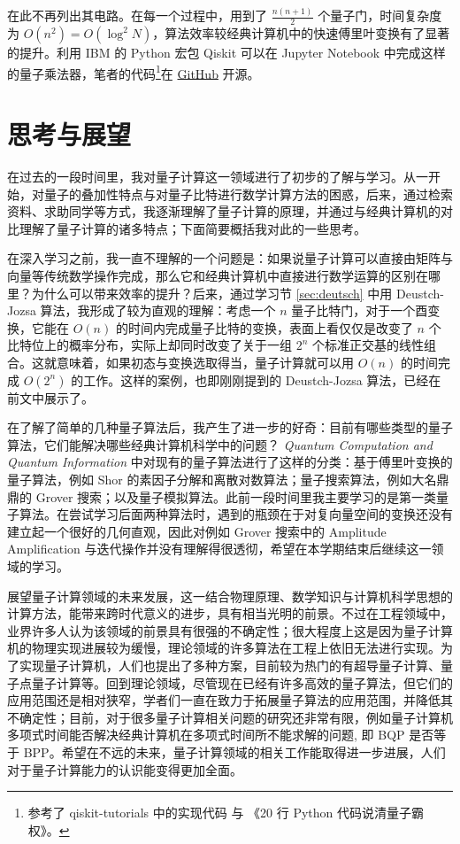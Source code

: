 \documentclass[a4paper,11pt,onecolumn,twoside]{article}
\begin{document}
在此不再列出其电路。在每一个过程中，用到了 $\frac{n(n+1)}{2}$ 个量子门，时间复杂度为 $O(n^2)=O(\log^2 N)$，算法效率较经典计算机中的快速傅里叶变换有了显著的提升。利用 IBM 的 Python 宏包 Qiskit 可以在 Jupyter Notebook 中完成这样的量子乘法器，笔者的代码\footnote{参考了 qiskit-tutorials 中的实现代码\cite{Qiskit} 与 《20 行 Python 代码说清量子霸权》\cite{马超20行Python代码说清量子霸权}。}在 \href{https://github.com/Conless/quantum-computing-intro/blob/main/src/qft.ipynb}{GitHub} 开源。

\section{思考与展望}

在过去的一段时间里，我对量子计算这一领域进行了初步的了解与学习。从一开始，对量子的叠加性特点与对量子比特进行数学计算方法的困惑，后来，通过检索资料、求助同学等方式，我逐渐理解了量子计算的原理，并通过与经典计算机的对比理解了量子计算的诸多特点；下面简要概括我对此的一些思考。

在深入学习之前，我一直不理解的一个问题是：如果说量子计算可以直接由矩阵与向量等传统数学操作完成，那么它和经典计算机中直接进行数学运算的区别在哪里？为什么可以带来效率的提升？后来，通过学习节 \ref{sec:deutsch} 中用 Deustch-Jozsa 算法，我形成了较为直观的理解：考虑一个 $n$ 量子比特门，对于一个酉变换，它能在 $O(n)$ 的时间内完成量子比特的变换，表面上看仅仅是改变了 $n$ 个比特位上的概率分布，实际上却同时改变了关于一组 $2^n$ 个标准正交基的线性组合。这就意味着，如果初态与变换选取得当，量子计算就可以用 $O(n)$ 的时间完成 $O(2^n)$ 的工作。这样的案例，也即刚刚提到的 Deustch-Jozsa 算法，已经在前文中展示了。

在了解了简单的几种量子算法后，我产生了进一步的好奇：目前有哪些类型的量子算法，它们能解决哪些经典计算机科学中的问题？\textit{ Quantum Computation and Quantum Information}\cite{nielsen2002quantum} 中对现有的量子算法进行了这样的分类：基于傅里叶变换的量子算法，例如 Shor 的素因子分解和离散对数算法；量子搜索算法，例如大名鼎鼎的 Grover 搜索；以及量子模拟算法。此前一段时间里我主要学习的是第一类量子算法。在尝试学习后面两种算法时，遇到的瓶颈在于对复向量空间的变换还没有建立起一个很好的几何直观，因此对例如 Grover 搜索中的 Amplitude Amplification 与迭代操作并没有理解得很透彻，希望在本学期结束后继续这一领域的学习。

展望量子计算领域的未来发展，这一结合物理原理、数学知识与计算机科学思想的计算方法，能带来跨时代意义的进步，具有相当光明的前景。不过在工程领域中，业界许多人认为该领域的前景具有很强的不确定性；很大程度上这是因为量子计算机的物理实现进展较为缓慢，理论领域的许多算法在工程上依旧无法进行实现。为了实现量子计算机，人们也提出了多种方案，目前较为热门的有超导量子计算、量子点量子计算等。回到理论领域，尽管现在已经有许多高效的量子算法，但它们的应用范围还是相对狭窄，学者们一直在致力于拓展量子算法的应用范围，并降低其不确定性；目前，对于很多量子计算相关问题的研究还非常有限\cite{孙晓明2016量子计算若干前沿问题综述}，例如量子计算机多项式时间能否解决经典计算机在多项式时间所不能求解的问题, 即 BQP 是否等于 BPP。希望在不远的未来，量子计算领域的相关工作能取得进一步进展，人们对于量子计算能力的认识能变得更加全面。
\end{document}
